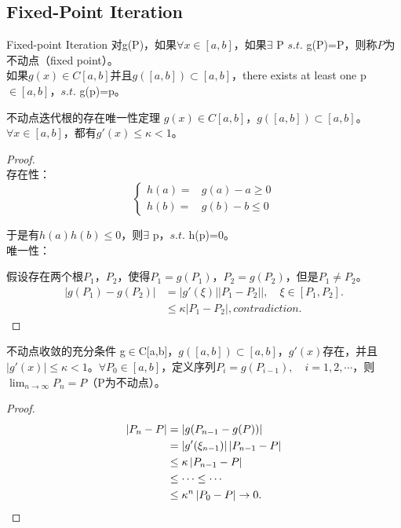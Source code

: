 \subsection{Fixed-Point Iteration}
\begin{defn}{Fixed-point Iteration}
对g(P)，如果$\forall x\in [a,b]$，如果$\exists$ P $s.t.$ g(P)=P，则称$P$为不动点（fixed point）。\\
如果$g(x)\in C[a,b]$并且$g([a,b])\subset[a,b]$，there exists at least one p$\in[a,b]$，$s.t.$ g(p)=p。
\end{defn}
\begin{theo}{不动点迭代根的存在唯一性定理}
$g(x)\in C[a,b]$，$g([a,b])\subset[a,b]$。$\forall x\in [a,b]$，都有$g'(x)\leq\kappa<1$。
\end{theo}
\begin{proof}\\
    存在性：
    \begin{equation*}
        \begin{cases}
          h(a) =&g(a)-a \geq 0 \\
          h(b) =&g(b)-b \leq 0
        \end{cases}
    \end{equation*}\par
    于是有$h(a)h(b)\leq 0$，则$\exists$ p，$s.t.$ h(p)=0。\\
    唯一性：\par
    假设存在两个根$P_1$，$P_2$，使得$P_1=g(P_1)$，$P_2=g(P_2)$，但是$P_1\neq P_2$。
    \begin{align*}
        \left|g(P_1)-g(P_2)\right| &= \left|g'(\xi)\right|\left| P_1-P_2|\right|,\quad \xi\in [P_1,P_2]. \\
        &\leq \kappa\left|P_1-P_2\right|, contradiction.
    \end{align*}
\end{proof}
\begin{theo}{不动点收敛的充分条件}\label{theo:fixed_point}
g$\in$C[a,b]，$g([a,b])\subset[a,b]$，$g'(x)$存在，并且$\left|g'(x)\right|\leq\kappa <1$。$\forall P_0\in[a,b]$，定义序列$P_i=g(P_{i-1}),\quad i=1,2,\cdots$，则$\lim_{n\rightarrow\infty}P_n=P$（P为不动点）。
\end{theo}
\begin{proof}
    \begin{align*}
        \left|P_n-P\right| &= \left|g(P_{n-1}-g(P))\right| \\
        &= \left|g'(\xi_{n-1})\right|\left|P_{n-1}-P\right| \\
        &\leq \kappa\left|P_{n-1}-P\right| \\
        &\leq \cdots \leq \cdots \\
        &\leq \kappa^n\left|P_0-P\right| \rightarrow 0.
    \end{align*}
\end{proof}\par
